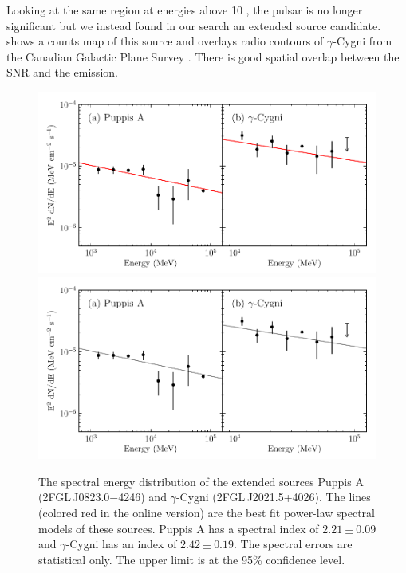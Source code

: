 Looking at the same region at energies above 10 \gev, the pulsar is
no longer significant but we instead found in our search an extended
source candidate.   shows a counts map
of this source and overlays radio contours of $\gamma$-Cygni from the
Canadian Galactic Plane Survey \citep{taylor_2003a_canadian-galactic}.
There is good spatial overlap between the SNR and the \gev emission.

\begin{figure}[htbp]
    \ifcolorfigure
      \includegraphics{summary_plots/snr_seds_color.pdf}
    \else
      \includegraphics{summary_plots/snr_seds_bw.pdf}
    \fi
    \caption{
    The spectral energy distribution of the extended sources 
    Puppis A (2FGL\,J0823.0$-$4246) and $\gamma$-Cygni 
    (2FGL\,J2021.5+4026).
    The lines (colored red in the online version)
    are the best fit power-law spectral models of
    these sources. Puppis A has a spectral index of
    $2.21\pm0.09$ and $\gamma$-Cygni has an
    index of $2.42\pm0.19$.
    The spectral errors are statistical only.
    The upper limit is at the 95\% confidence level.
    }
  \end{figure}


